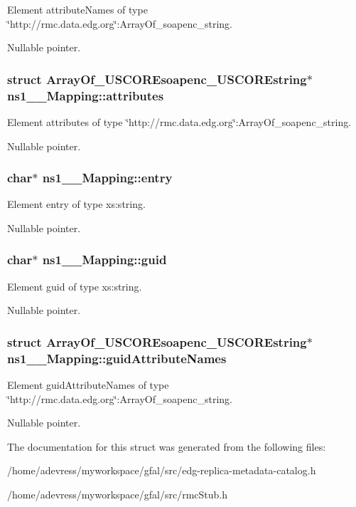 Element attribute\-Names of type \char`\"{}http://rmc.data.edg.org\char`\"{}:Array\-Of\_\-soapenc\_\-string. 

Nullable pointer. 
\subsubsection{\setlength{\rightskip}{0pt plus 5cm}struct \bf{Array\-Of\_\-USCOREsoapenc\_\-USCOREstring}$\ast$ \bf{ns1\_\-\_\-Mapping::attributes}}\label{structns1____Mapping_8095d927d5e70c759cf8c7a7e7df9623}


Element attributes of type \char`\"{}http://rmc.data.edg.org\char`\"{}:Array\-Of\_\-soapenc\_\-string. 

Nullable pointer. 
\subsubsection{\setlength{\rightskip}{0pt plus 5cm}char$\ast$ \bf{ns1\_\-\_\-Mapping::entry}}\label{structns1____Mapping_aa1a2dbb201e59a114d0488a64c01862}


Element entry of type xs:string. 

Nullable pointer. 
\subsubsection{\setlength{\rightskip}{0pt plus 5cm}char$\ast$ \bf{ns1\_\-\_\-Mapping::guid}}\label{structns1____Mapping_84fc211e929bcde53718bc8e8b4b3686}


Element guid of type xs:string. 

Nullable pointer. 
\subsubsection{\setlength{\rightskip}{0pt plus 5cm}struct \bf{Array\-Of\_\-USCOREsoapenc\_\-USCOREstring}$\ast$ \bf{ns1\_\-\_\-Mapping::guid\-Attribute\-Names}}\label{structns1____Mapping_c53c70829394dd85f68cff7c4f111b42}


Element guid\-Attribute\-Names of type \char`\"{}http://rmc.data.edg.org\char`\"{}:Array\-Of\_\-soapenc\_\-string. 

Nullable pointer. 

The documentation for this struct was generated from the following files:\begin{CompactItemize}
\item 
/home/adevress/myworkspace/gfal/src/edg-replica-metadata-catalog.h\item 
/home/adevress/myworkspace/gfal/src/rmc\-Stub.h\end{CompactItemize}
